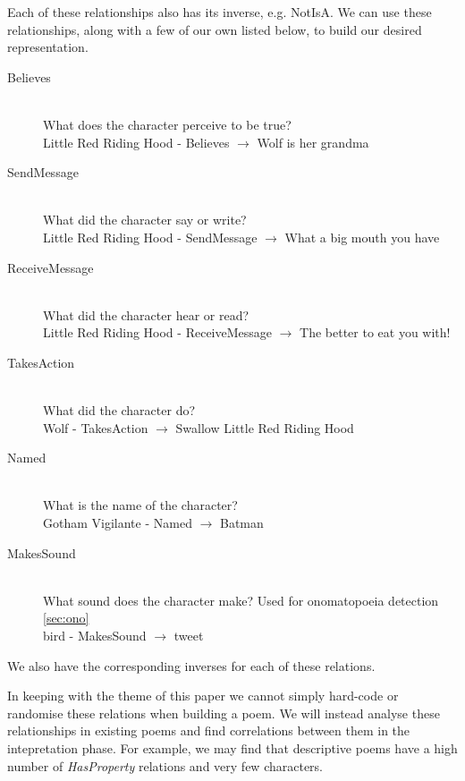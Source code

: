 Each of these relationships also has its inverse, e.g. NotIsA. We can use these relationships, along with a few of our own listed below, to build our desired representation.

\begin{description}
\item[Believes] \hfill \\ What does the character perceive to be true? \hfill \\ Little Red Riding Hood - Believes $\rightarrow$ Wolf is her grandma
\item[SendMessage] \hfill \\ What did the character say or write?  \hfill \\ Little Red Riding Hood - SendMessage $\rightarrow$ What a big mouth you have
\item[ReceiveMessage] \hfill \\ What did the character hear or read?  \hfill \\ Little Red Riding Hood - ReceiveMessage $\rightarrow$ The better to eat you with!
\item[TakesAction] \hfill \\ What did the character do?  \hfill \\ Wolf - TakesAction $\rightarrow$ Swallow Little Red Riding Hood
\item[Named] \hfill \\ What is the name of the character? \hfill \\ Gotham Vigilante - Named $\rightarrow$ Batman
\item[MakesSound] \hfill \\ What sound does the character make? Used for onomatopoeia detection \ref{sec:ono} \hfill \\ bird - MakesSound $\rightarrow$ tweet
\end{description}

We also have the corresponding inverses for each of these relations. 

In keeping with the theme of this paper we cannot simply hard-code or randomise these relations when building a poem. We will instead analyse these relationships in existing poems and find correlations between them in the intepretation phase. For example, we may find that descriptive poems have a high number of \textit{HasProperty} relations and very few characters.  

